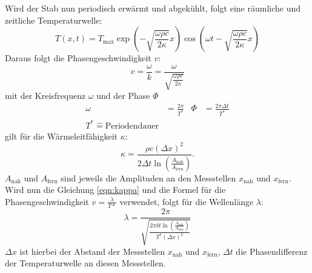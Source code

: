Wird der Stab nun periodisch erwärmt und abgekühlt, folgt eine räumliche und zeitliche Temperaturwelle:
\begin{equation}\label{eqn:Tempwelle}
    T(x,t) = T_\text{max} \exp(-\sqrt{\frac{\omega \rho c}{2\kappa}}x)\cos(\omega t - \sqrt{\frac{\omega \rho c}{2\kappa}}x)
\end{equation}
Daraus folgt die Phasengeschwindigkeit $v$:
\begin{equation}
    v = \frac{\omega}{k} 
    = \frac{\omega}{\sqrt{\frac{\omega \rho c}{2\kappa}}}
\end{equation}
mit der Kreisfrequenz $\omega$ und der Phase $\Phi$
\begin{align*}
    \omega     &= \frac{2\pi}{T^*}   &  \Phi      &= \frac{2\pi \Delta t}{T^*} \\
    T^* \widehat{=}  \text{Periodendauer} 
\end{align*}
gilt für die Wärmeleitfähigkeit $\kappa$:
\begin{equation}\label{eqn:kappa}
    \kappa = \frac{\rho c (\Delta x)^2}{2\Delta t \ln (\frac{A_\text{nah}}{A_\text{fern}})} .
\end{equation}
$A_\text{nah}$ und $A_\text{fern}$ sind jeweils die Amplituden an den Messstellen $x_\text{nah}$ und $x_\text{fern}$.
Wird nun die Gleichung \ref{eqn:kappa} und die Formel für die Phasengeschwindigkeit $v = \frac{\lambda}{T*}$ verwendet, 
folgt für die Wellenlänge $\lambda$:
\begin{equation}\label{eqn:lambda}
    \lambda = \frac{2\pi}{\sqrt{\frac{2\pi \delta t \ln (\frac{A_\text{nah}}{A_\text{fern}})}{T^* (\Delta x)^2}}}
\end{equation}
$\Delta x$ ist hierbei der Abstand der Messstellen $x_\text{nah}$ und $x_\text{fern}$, $\Delta t$ die Phasendifferenz der Temperaturwelle an diesen Messstellen.

